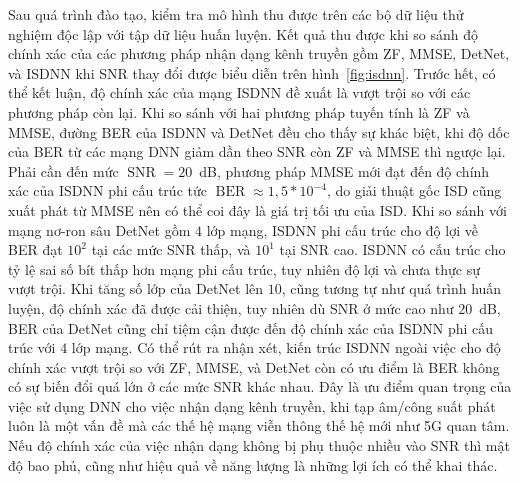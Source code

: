 Sau quá trình đào tạo, kiểm tra mô hình thu được trên các bộ dữ liệu thử nghiệm độc lập với tập dữ liệu huấn luyện. Kết quả thu được khi so sánh độ chính xác của các phương pháp nhận dạng kênh truyền gồm ZF, MMSE, DetNet, và ISDNN khi SNR thay đổi được biểu diễn trên hình~\ref{fig:isdnn}. Trước hết, có thể kết luận, độ chính xác của mạng ISDNN đề xuất là vượt trội so với các phương pháp còn lại. Khi so sánh với hai phương pháp tuyến tính là ZF và MMSE, đường BER của ISDNN và DetNet đều cho thấy sự khác biệt, khi độ dốc của BER từ các mạng DNN giảm dần theo SNR còn ZF và MMSE thì ngược lại. Phải cần đến mức $\operatorname{SNR}=20$~dB, phương pháp MMSE mới đạt đến độ chính xác của ISDNN phi cấu trúc tức $\operatorname{BER}\approx 1,5* 10^{-4}$, do giải thuật gốc ISD cũng xuất phát từ MMSE nên có thể coi đây là giá trị tối ưu của ISD. Khi so sánh với mạng nơ-ron sâu DetNet gồm $4$ lớp mạng, ISDNN phi cấu trúc cho độ lợi về BER đạt $10^2$ tại các mức SNR thấp, và $10^1$ tại SNR cao. ISDNN có cấu trúc cho tỷ lệ sai số bít thấp hơn mạng phi cấu trúc, tuy nhiên độ lợi và chưa thực sự vượt trội. Khi tăng số lớp của DetNet lên $10$, cũng tương tự như quá trình huấn luyện, độ chính xác đã được cải thiện, tuy nhiên dù SNR ở mức cao như $20$~dB, BER của DetNet cũng chỉ tiệm cận được đến độ chính xác của ISDNN phi cấu trúc với $4$ lớp mạng.
Có thể rút ra nhận xét, kiến trúc ISDNN ngoài việc cho độ chính xác vượt trội so với ZF, MMSE, và DetNet còn có ưu điểm là BER không có sự biến đổi quá lớn ở các mức SNR khác nhau. Đây là ưu điểm quan trọng của việc sử dụng DNN cho việc nhận dạng kênh truyền, khi tạp âm/công suất phát luôn là một vấn đề mà các thế hệ mạng viễn thông thế hệ mới như 5G quan tâm. Nếu độ chính xác của việc nhận dạng không bị phụ thuộc nhiều vào SNR thì mật độ bao phủ, cũng như hiệu quả về năng lượng là những lợi ích có thể khai thác.

